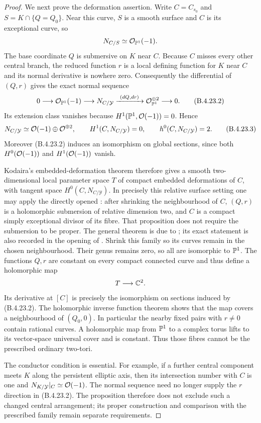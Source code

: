 \begin{proof}
We next prove the deformation assertion. Write
$C=C_{s_0}$ and $S=K\cap\{Q=Q_0\}$. Near this curve,
$S$ is a smooth surface and $C$ is its exceptional curve,
so
\[
 N_{C/S}\simeq\mathcal O_{\mathbb P^1}(-1).
\]
The base coordinate $Q$ is submersive on $K$ near $C$.
Because $C$ misses every other central branch, the reduced
function $r$ is a local defining function for $K$ near
$C$ and its normal derivative is nowhere zero.
Consequently the differential of $(Q,r)$ gives the exact
normal sequence
\[
 0\longrightarrow\mathcal O_{\mathbb P^1}(-1)
 \longrightarrow N_{C/\mathcal Y}
 \xrightarrow{\ (dQ,dr)\ }
 \mathcal O_{\mathbb P^1}^{\oplus2}\longrightarrow0.
                                                        \tag{B.4.23.2}
\]
Its extension class vanishes because
$H^1(\mathbb P^1,\mathcal O(-1))=0$. Hence
\[
 N_{C/\mathcal Y}\simeq
 \mathcal O(-1)\oplus\mathcal O^{\oplus2},\qquad
 H^1(C,N_{C/\mathcal Y})=0,\qquad
 h^0(C,N_{C/\mathcal Y})=2.                             \tag{B.4.23.3}
\]
Moreover (B.4.23.2) induces an isomorphism on global
sections, since both $H^0(\mathcal O(-1))$ and $H^1(\mathcal O(-1))$
vanish.

Kodaira's embedded-deformation theorem therefore gives a
smooth two-dimensional local parameter space $T$ of
compact embedded deformations of $C$, with tangent space
$H^0(C,N_{C/\mathcal Y})$. In precisely this relative
surface setting one may apply the directly opened
\citet[Proposition 2.3 and its proof, pp.~6--7 of the
original preprint]{DlousskyTeleman2012AB}: after shrinking
the neighbourhood of $C$, $(Q,r)$ is a holomorphic
submersion of relative dimension two, and $C$ is a
compact simply exceptional divisor of its fibre.
That proposition does not require the submersion to be
proper. The general theorem is due to
\citet{Kodaira1962D}; its exact statement is also recorded
in the opening of \citet{Merkulov1995D}.
Shrink this family so its curves
remain in the chosen neighbourhood. Their genus remains
zero, so all are isomorphic to $\mathbb P^1$.
The functions $Q,r$ are constant on every compact
connected curve and thus define a holomorphic map
\[
 T\longrightarrow\mathbb C^2.
\]
Its derivative at $[C]$ is precisely the isomorphism on
sections induced by (B.4.23.2). The holomorphic inverse
function theorem shows that the map covers a neighbourhood
of $(Q_0,0)$. In particular the nearby fixed pairs with
$r\ne0$ contain rational curves. A holomorphic map from
$\mathbb P^1$ to a complex torus lifts to its vector-space
universal cover and is constant. Thus those fibres cannot
be the prescribed ordinary two-tori.

The conductor condition is essential. For example, if a
further central component meets $K$ along the persistent
elliptic axis, then its intersection number with $C$ is
one and $N_{K/\mathcal Y}|_C\simeq\mathcal O(-1)$.
The normal sequence need no longer supply the $r$ direction
in (B.4.23.2). The proposition therefore does not exclude
such a changed central arrangement; its proper construction
and comparison with the prescribed family remain separate
requirements.
\end{proof}

